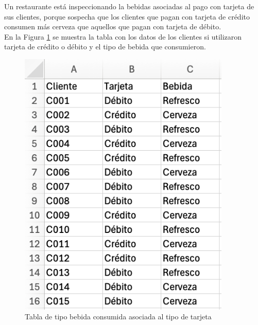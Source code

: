 \documentclass{article}
\begin{document}
Un restaurante está inspeccionando la bebidas asociadas al pago con tarjeta de sus clientes, porque sospecha que los clientes que pagan con tarjeta de crédito consumen más cerveza que aquellos que pagan con tarjeta de débito.
\\[12pt]
En la Figura \ref{fig:p202} se muestra la tabla con los datos de los clientes si utilizaron tarjeta de crédito o débito y el tipo de bebida que consumieron.
\begin{figure}[!ht]
    \centering
    \begin{minipage}{\textwidth}
        \centering
        \includegraphics[width=0.9\textwidth]{figures/p202.png}
    \end{minipage}
    \captionsetup{width=0.9\textwidth}
    \caption{Tabla de tipo bebida consumida asociada al tipo de tarjeta}
    \label{fig:p202}
\end{figure}
\\
\end{document}
